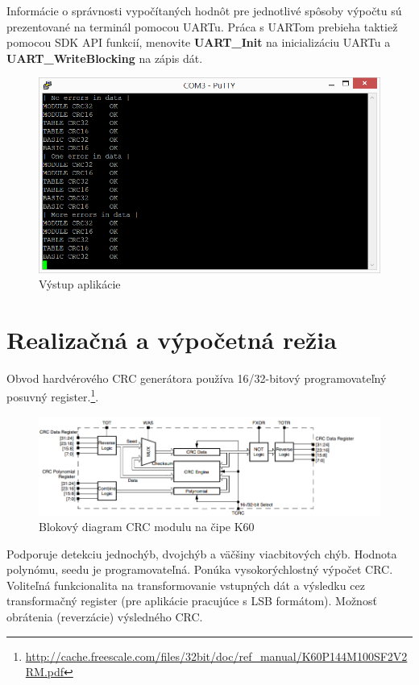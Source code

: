 \documentclass[10pt,a4paper]{article}
\begin{document}
	Informácie o správnosti vypočítaných hodnôt pre jednotlivé spôsoby výpočtu sú prezentované na terminál pomocou UARTu. Práca s UARTom prebieha taktiež pomocou SDK API funkcií, menovite \textbf{UART\_Init} na inicializáciu UARTu a \textbf{UART\_WriteBlocking} na zápis dát.
	
	\begin{figure}[h!]
		\includegraphics[]{output.png}
		\caption{Výstup aplikácie}
	\end{figure}
	
\newpage

\section{Realizačná a výpočetná režia}
	Obvod hardvérového CRC generátora používa 16/32-bitový programovateľný posuvný register.\footnote{\url{http://cache.freescale.com/files/32bit/doc/ref_manual/K60P144M100SF2V2RM.pdf}}. 

\begin{figure}[h!]
	\includegraphics[]{crcmodule.png}
	\caption{Blokový diagram CRC modulu na čipe K60}
\end{figure}


	Podporuje detekciu jednochýb, dvojchýb a väčšiny viacbitových chýb. Hodnota polynómu, seedu je programovateľná. Ponúka vysokorýchlostný výpočet CRC. Voliteľná funkcionalita na transformovanie vstupných dát a výsledku cez transformačný register (pre aplikácie pracujúce s LSB formátom). Možnosť obrátenia (reverzácie) výsledného CRC. 
	
\end{document}
